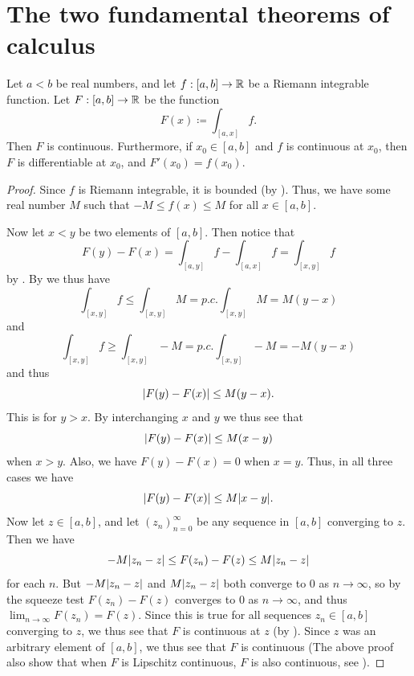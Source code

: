 \section{The two fundamental theorems of calculus}\label{i:sec:11.9}

\begin{thm}\label{i:11.9.1}
  Let \(a < b\) be real numbers, and let \(f : [a, b] \to \mathbb{R}\) be a Riemann integrable function.
  Let \(F : [a, b] \to \mathbb{R}\) be the function
  \[
    F(x) \coloneqq \int_{[a, x]} f.
  \]
  Then \(F\) is continuous.
  Furthermore, if \(x_0 \in [a, b]\) and \(f\) is continuous at \(x_0\), then \(F\) is differentiable at \(x_0\), and \(F'(x_0) = f(x_0)\).
\end{thm}

\begin{proof}
  Since \(f\) is Riemann integrable, it is bounded (by ).
  Thus, we have some real number \(M\) such that \(-M \leq f(x) \leq M\) for all \(x \in [a, b]\).

  Now let \(x < y\) be two elements of \([a, b]\).
  Then notice that
  \[
    F(y) - F(x) = \int_{[a, y]} f - \int_{[a, x]} f = \int_{[x, y]} f
  \]
  by .
  By  we thus have
  \[
    \int_{[x, y]} f \leq \int_{[x, y]} M = p.c. \int_{[x, y]} M = M(y - x)
  \]
  and
  \[
    \int_{[x, y]} f \geq \int_{[x, y]} -M = p.c. \int_{[x, y]} -M = -M(y - x)
  \]
  and thus
  \[
    \left\lvert F(y) - F(x)\right\rvert \leq M(y - x).
  \]
  This is for \(y > x\).
  By interchanging \(x\) and \(y\) we thus see that
  \[
    \left\lvert F(y) - F(x)\right\rvert \leq M(x - y)
  \]
  when \(x > y\).
  Also, we have \(F(y) - F(x) = 0\) when \(x = y\).
  Thus, in all
  three cases we have
  \[
    \abs{F(y) - F(x)} \leq M \abs{x - y}.
  \]
  Now let \(z \in [a, b]\), and let \((z_n)_{n = 0}^\infty\) be any sequence in \([a, b]\) converging to \(z\).
  Then we have
  \[
    -M \abs{z_n - z} \leq F(z_n) - F(z) \leq M \abs{z_n - z}
  \]
  for each \(n\).
  But \(-M \abs{z_n - z}\) and \(M \abs{z_n - z}\) both converge to \(0\) as \(n \to \infty\), so by the squeeze test \(F(z_n) - F(z)\) converges to \(0\) as \(n \to \infty\), and thus \(\lim_{n \to \infty} F(z_n) = F(z)\).
  Since this is true for all sequences \(z_n \in [a, b]\) converging to \(z\), we thus see that \(F\) is continuous at \(z\) (by ).
  Since \(z\) was an arbitrary element of \([a, b]\), we thus see that \(F\) is continuous
  (The above proof also show that when \(F\) is Lipschitz continuous, \(F\) is also continuous, see ).


\end{proof}
